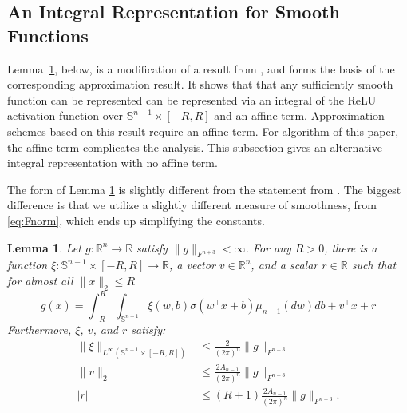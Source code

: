 \documentclass[twoside]{article}
\newtheorem{lemma}{Lemma}
\theoremstyle{definition}
\newcommand{\R}{\mathbb{R}}
\renewcommand{\S}{\mathbb{S}}
\newcommand{\1}[1]{\scalebox{1.25}{$\mathds{1}$}\left[#1\right]}
\begin{document}
\subsection{An Integral Representation for Smooth Functions}
\label{appss:integral}
Lemma~\ref{lem:integral}, below, is a modification of a result from \cite{lamperski2024approximation}, and forms the basis of the corresponding approximation result. It shows that that any sufficiently smooth function can be represented can be represented via an integral of the ReLU activation function over $\S^{n-1}\times [-R,R]$ and an affine term. Approximation schemes based on this result require an affine term. For algorithm of this paper, the affine term complicates the analysis. This subsection gives an alternative integral representation with no affine term. 

The form of Lemma \ref{lem:integral} is slightly different from the statement from \cite{lamperski2024approximation}. The biggest difference is that we utilize a slightly different measure of smoothness, from \eqref{eq:Fnorm}, which ends up simplifying the constants. 


\begin{lemma}
  \label{lem:integral}
  {\it
    Let $g:\R^n\to \R$ satisfy $\|g\|_{F^{n+3}}<\infty$. For any $R>0$,
    there is a function $\xi:\S^{n-1}\times [-R,R]\to \R$, a vector $v\in\R^n$, and a scalar $r\in\R$ such that for almost all $\|x\|_2\le R$
  \begin{equation*}
    g(x)=\int_{-R}^R\int_{\S^{n-1}} \xi(w,b)\sigma(w^\top x+b)\mu_{n-1}(dw)db
        +v^\top x +r 
    \end{equation*} 
Furthermore, $\xi$, $v$, and $r$ satisfy:
\begin{align*}
   \|\xi\|_{L^{\infty}(\S^{n-1}\times [-R,R])}&\le \frac{2}{(2\pi)^n}\|g\|_{F^{n+3}} \\
  \|v\|_2 & \le \frac{2A_{n-1}}{(2\pi)^n} \|g\|_{F^{n+3}} \\
  |r|&\le (R+1)\frac{2A_{n-1}}{(2\pi)^n}\|g\|_{F^{n+3}}.
\end{align*}
  }
\end{lemma}
\end{document}
